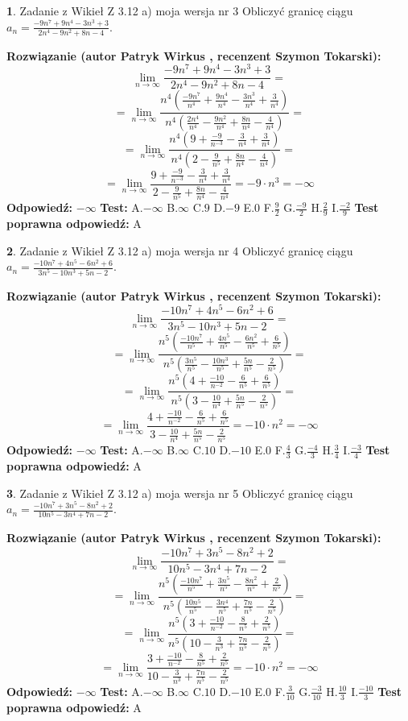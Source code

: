 \documentclass[12pt, a4paper]{article}
\theoremstyle{definition} %
\newtheorem{zad}{}
\newcommand{\zadStart}[1]{\begin{zad}#1\newline}
\newcommand{\zadStop}{\end{zad}}
\newcommand{\rozwStart}[2]{\noindent \textbf{Rozwiązanie (autor #1 , recenzent #2): }\newline}
\newcommand{\rozwStop}{\newline}
\newcommand{\odpStart}{\noindent \textbf{Odpowiedź:}\newline}
\newcommand{\odpStop}{\newline}
\newcommand{\testStart}{\noindent \textbf{Test:}\newline}
\newcommand{\testStop}{\newline}
\newcommand{\kluczStart}{\noindent \textbf{Test poprawna odpowiedź:}\newline}
\newcommand{\kluczStop}{\newline}
\begin{document}
\zadStart{Zadanie z Wikieł Z 3.12 a) moja wersja nr 3}
Obliczyć granicę ciągu $a_{n}=\frac{-9n^{7}+9n^{4}-3n^{3}+3}{2n^{4}-9n^{2}+8n-4}$.
\zadStop
\rozwStart{Patryk Wirkus}{Szymon Tokarski}
$$\lim\limits_{n\to\infty}\frac{-9n^{7}+9n^{4}-3n^{3}+3}{2n^{4}-9n^{2}+8n-4}=$$
$$=\lim\limits_{n\to\infty}\frac{n^{4}\left(\frac{-9n^{7}}{n^{4}}+\frac{9n^{4}}{n^{4}}-\frac{3n^{3}}{n^{4}}+\frac{3}{n^{4}}\right)}{n^{4}\left(\frac{2n^{4}}{n^{4}}-\frac{9n^{2}}{n^{4}}+\frac{8n}{n^{4}}-\frac{4}{n^{4}}\right)}=$$
$$=\lim\limits_{n\to\infty}\frac{n^{4}\left(9+\frac{-9}{n^{-3}}-\frac{3}{n^{4}}+\frac{3}{n^{4}}\right)}
{n^{4}\left(2-\frac{9}{n^{5}}+\frac{8n}{n^{4}}-\frac{4}{n^{4}}\right)}=$$
$$=\lim\limits_{n\to\infty}\frac{9+\frac{-9}{n^{-3}}-\frac{3}{n^{4}}+\frac{3}{n^{4}}}{2-\frac{9}{n^{5}}+\frac{8n}{n^{4}}-\frac{4}{n^{4}}}=-9\cdot n^{3} = -\infty$$
\rozwStop
\odpStart
$-\infty$
\odpStop
\testStart
A.$-\infty$
B.$\infty$
C.$9$
D.$-9$
E.$0$
F.$\frac{9}{2}$
G.$\frac{-9}{2}$
H.$\frac{2}{9}$
I.$\frac{-2}{9}$
\testStop
\kluczStart
A
\kluczStop



\zadStart{Zadanie z Wikieł Z 3.12 a) moja wersja nr 4}
Obliczyć granicę ciągu $a_{n}=\frac{-10n^{7}+4n^{5}-6n^{2}+6}{3n^{5}-10n^{3}+5n-2}$.
\zadStop
\rozwStart{Patryk Wirkus}{Szymon Tokarski}
$$\lim\limits_{n\to\infty}\frac{-10n^{7}+4n^{5}-6n^{2}+6}{3n^{5}-10n^{3}+5n-2}=$$
$$=\lim\limits_{n\to\infty}\frac{n^{5}\left(\frac{-10n^{7}}{n^{5}}+\frac{4n^{5}}{n^{5}}-\frac{6n^{2}}{n^{5}}+\frac{6}{n^{5}}\right)}{n^{5}\left(\frac{3n^{5}}{n^{5}}-\frac{10n^{3}}{n^{5}}+\frac{5n}{n^{5}}-\frac{2}{n^{5}}\right)}=$$
$$=\lim\limits_{n\to\infty}\frac{n^{5}\left(4+\frac{-10}{n^{-2}}-\frac{6}{n^{5}}+\frac{6}{n^{5}}\right)}
{n^{5}\left(3-\frac{10}{n^{4}}+\frac{5n}{n^{5}}-\frac{2}{n^{5}}\right)}=$$
$$=\lim\limits_{n\to\infty}\frac{4+\frac{-10}{n^{-2}}-\frac{6}{n^{5}}+\frac{6}{n^{5}}}{3-\frac{10}{n^{4}}+\frac{5n}{n^{5}}-\frac{2}{n^{5}}}=-10\cdot n^{2} = -\infty$$
\rozwStop
\odpStart
$-\infty$
\odpStop
\testStart
A.$-\infty$
B.$\infty$
C.$10$
D.$-10$
E.$0$
F.$\frac{4}{3}$
G.$\frac{-4}{3}$
H.$\frac{3}{4}$
I.$\frac{-3}{4}$
\testStop
\kluczStart
A
\kluczStop



\zadStart{Zadanie z Wikieł Z 3.12 a) moja wersja nr 5}
Obliczyć granicę ciągu $a_{n}=\frac{-10n^{7}+3n^{5}-8n^{2}+2}{10n^{5}-3n^{4}+7n-2}$.
\zadStop
\rozwStart{Patryk Wirkus}{Szymon Tokarski}
$$\lim\limits_{n\to\infty}\frac{-10n^{7}+3n^{5}-8n^{2}+2}{10n^{5}-3n^{4}+7n-2}=$$
$$=\lim\limits_{n\to\infty}\frac{n^{5}\left(\frac{-10n^{7}}{n^{5}}+\frac{3n^{5}}{n^{5}}-\frac{8n^{2}}{n^{5}}+\frac{2}{n^{5}}\right)}{n^{5}\left(\frac{10n^{5}}{n^{5}}-\frac{3n^{4}}{n^{5}}+\frac{7n}{n^{5}}-\frac{2}{n^{5}}\right)}=$$
$$=\lim\limits_{n\to\infty}\frac{n^{5}\left(3+\frac{-10}{n^{-2}}-\frac{8}{n^{5}}+\frac{2}{n^{5}}\right)}
{n^{5}\left(10-\frac{3}{n^{3}}+\frac{7n}{n^{5}}-\frac{2}{n^{5}}\right)}=$$
$$=\lim\limits_{n\to\infty}\frac{3+\frac{-10}{n^{-2}}-\frac{8}{n^{5}}+\frac{2}{n^{5}}}{10-\frac{3}{n^{3}}+\frac{7n}{n^{5}}-\frac{2}{n^{5}}}=-10\cdot n^{2} = -\infty$$
\rozwStop
\odpStart
$-\infty$
\odpStop
\testStart
A.$-\infty$
B.$\infty$
C.$10$
D.$-10$
E.$0$
F.$\frac{3}{10}$
G.$\frac{-3}{10}$
H.$\frac{10}{3}$
I.$\frac{-10}{3}$
\testStop
\kluczStart
A
\kluczStop
\end{document}
